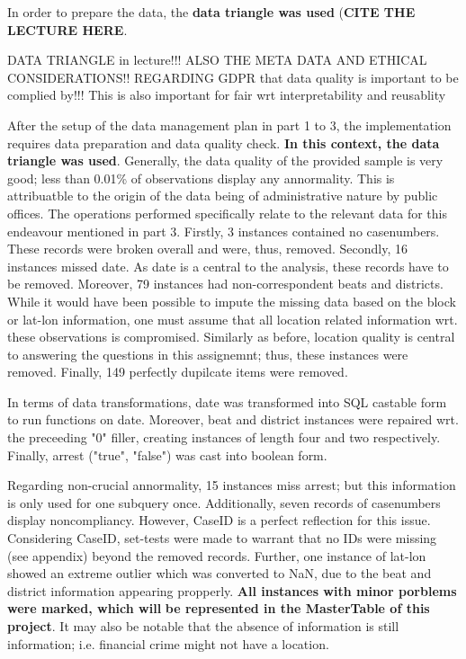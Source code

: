 \documentclass[a4paper]{article}
\begin{document}
In order to prepare the data, the \textbf{data triangle was used} (\textbf{CITE THE LECTURE HERE}. 




DATA TRIANGLE in lecture!!!
ALSO THE META DATA AND ETHICAL CONSIDERATIONS!! REGARDING GDPR that data quality is important to be complied by!!! This is also important for fair wrt interpretability and reusablity


After the setup of the data management plan in part 1 to 3, the implementation requires data preparation and data quality check. \textbf{In this context, the data triangle was used}. Generally, the data quality of the provided sample is very good; less than 0.01\% of observations display any annormality. This is attribuatble to the origin of the data being of administrative nature by public offices.
\indent The operations performed specifically relate to the relevant data for this endeavour mentioned in part 3. Firstly, 3 instances contained no casenumbers. These records were broken overall and were, thus, removed. Secondly, 16 instances missed date. As date is a central to the analysis, these records have to be removed. Moreover, 79 instances had non-correspondent beats and districts. While it would have been possible to impute the missing data based on the block or lat-lon information, one must assume that all location related information wrt. these observations is compromised. Similarly as before, location quality is central to answering the questions in this assignemnt; thus, these instances were removed. Finally, 149 perfectly dupilcate items were removed. 

\indent In terms of data transformations, date was transformed into SQL castable form to run functions on date. Moreover, beat and district instances were repaired wrt. the preceeding "0" filler, creating instances of length four and two respectively. Finally, arrest ("true", "false") was cast into boolean form. 

\indent Regarding non-crucial annormality, 15 instances miss arrest; but this information is only used for one subquery once. Additionally, seven records of casenumbers display noncompliancy. However, CaseID is a perfect reflection for this issue. Considering CaseID, set-tests were made to warrant that no IDs were missing (see appendix) beyond the removed records. Further, one instance of lat-lon showed an extreme outlier which was converted to NaN, due to the beat and district information appearing propperly.\textbf{ All instances with minor porblems were marked, which will} \textbf{be represented in the MasterTable of this project}. It may also be notable that the absence of information is still information; i.e. financial crime might not have a location. 
\end{document}
